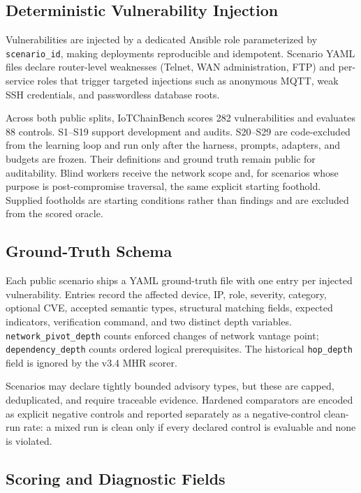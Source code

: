 \documentclass[conference,compsoc]{IEEEtran}
\newcommand{\systemname}{IoTChainBench\xspace}
\begin{document}
\subsection{Deterministic Vulnerability Injection}
\label{sec:iotbench:inject}

Vulnerabilities are injected by a dedicated Ansible role parameterized by \texttt{scenario\_id}, making deployments reproducible and idempotent. Scenario YAML files declare router-level weaknesses (Telnet, WAN administration, FTP) and per-service roles that trigger targeted injections such as anonymous MQTT, weak SSH credentials, and passwordless database roots.

Across both public splits, \systemname{} scores 282 vulnerabilities and evaluates 88 controls. S1--S19 support development and audits. S20--S29 are code-excluded from the learning loop and run only after the harness, prompts, adapters, and budgets are frozen. Their definitions and ground truth remain public for auditability. Blind workers receive the network scope and, for scenarios whose purpose is post-compromise traversal, the same explicit starting foothold. Supplied footholds are starting conditions rather than findings and are excluded from the scored oracle.

\subsection{Ground-Truth Schema}
\label{sec:iotbench:gt}

Each public scenario ships a YAML ground-truth file with one entry per injected vulnerability. Entries record the affected device, IP, role, severity, category, optional CVE, accepted semantic types, structural matching fields, expected indicators, verification command, and two distinct depth variables. \texttt{network\_pivot\_depth} counts enforced changes of network vantage point; \texttt{dependency\_depth} counts ordered logical prerequisites. The historical \texttt{hop\_depth} field is ignored by the v3.4 MHR scorer.

Scenarios may declare tightly bounded advisory types, but these are capped, deduplicated, and require traceable evidence. Hardened comparators are encoded as explicit negative controls and reported separately as a negative-control clean-run rate: a mixed run is clean only if every declared control is evaluable and none is violated.

\subsection{Scoring and Diagnostic Fields}
\label{sec:iotbench:eval}
\end{document}
